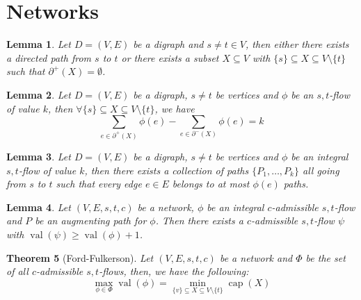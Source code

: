 \documentclass[paper=a4, fontsize=12pt]{scrartcl} %
\newtheorem{thm}{Theorem}[section]
\newtheorem{lem}[thm]{Lemma}
\theoremstyle{definition}
\theoremstyle{remark}
\DeclareMathOperator{\val}{val}
\DeclareMathOperator{\capac}{cap}
\numberwithin{equation}{section} %
\numberwithin{figure}{section} %
\numberwithin{table}{section} %
\begin{document}
\section{Networks}
\begin{lem}
	Let $D = (V,E)$ be a digraph and $s \neq t \in V$, then either there exists a directed path from $s$ to $t$ or there exists a subset $X \subseteq V$ with $\{s\} \subseteq X \subseteq V \setminus\{t\}$ such that $\partial^+(X) = \emptyset$.
\end{lem}
\begin{lem}
	Let $D=(V,E)$ be a digraph, $s\neq t$ be vertices and $\phi$ be an $s,t$-flow of value $k$, then $\forall \{s\} \subseteq X \subseteq V\setminus\{t\}$, we have 
	\[ \sum_{e \in \partial^+(X)}\phi(e) - \sum_{e \in \partial^-(X)}\phi(e) = k \]
\end{lem}
\begin{lem}
	Let $D=(V,E)$ be a digraph, $s\neq t$ be vertices and $\phi$ be an integral $s,t$-flow of value $k$, then there exists a collection of paths $\{P_1, \dots, P_k\}$ all going from $s$ to $t$ such that every edge $e \in E$ belongs to at most $\phi(e)$ paths. 
\end{lem}
\begin{lem}
	Let $(V,E,s,t,c)$ be a network, $\phi$ be an integral $c$-admissible $s,t$-flow and $P$ be an augmenting path for $\phi$. Then there exists a $c$-admissible $s,t$-flow $\psi$ with $\val(\psi) \geq \val(\phi) + 1$.
\end{lem}
\begin{thm}[Ford-Fulkerson]
	Let $(V,E,s,t,c)$ be a network and $\Phi$ be the set of all $c$-admissible $s,t$-flows, then, we have the following:
	\[ \max_{\phi \in \Phi} \val(\phi) = \min_{\{v\} \subseteq X \subseteq V \setminus \{t\}} \capac(X) \]
\end{thm}
\end{document}
